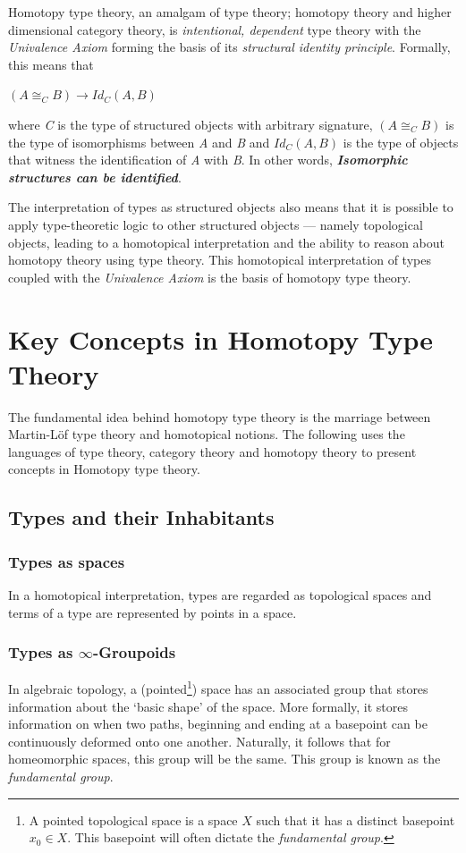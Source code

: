 \documentclass[12pt]{report}
\begin{document}
Homotopy type theory, an amalgam of type theory; homotopy theory and higher dimensional category theory, is \textit{intentional, dependent} type theory with the \textit{Univalence Axiom} forming the basis of its \textit{structural identity principle}. Formally, this means that
\begin{center}
$ (A \cong_C B) \rightarrow Id_C(A,B) $
\end{center}
where \textit{C} is the type of structured objects with arbitrary signature, $ (A \cong_C B)$ is the type of isomorphisms between \textit{A} and \textit{B} and $Id_C(A,B) $ is the type of objects that witness the identification of \textit{A} with \textit{B}. In other words, \textbf{\textit{Isomorphic structures can be identified}}.

The interpretation of types as structured objects also means that it is possible to apply type-theoretic logic to other structured objects --- namely topological objects, leading to a homotopical interpretation and the ability to reason about homotopy theory using type theory. This homotopical interpretation of types coupled with the \textit{Univalence Axiom} is the basis of homotopy type theory.

\pagebreak

\section{Key Concepts in Homotopy Type Theory}
The fundamental idea behind homotopy type theory is the marriage between Martin-L\"of type theory and homotopical notions. The following uses the languages of type theory, category theory and homotopy theory to present concepts in Homotopy type theory. 
\subsection{Types and their Inhabitants}
\subsubsection{Types as spaces}
In a homotopical interpretation, types are regarded as topological spaces and terms of a type are represented by points in a space.
\subsubsection{Types as $\infty$-Groupoids}
In algebraic topology, a (pointed\footnote{

A pointed topological space is a space $X$ such that it has a distinct basepoint $x_0 \in X$. This basepoint will often dictate the \textit{fundamental group}.

}) space has an associated group that stores information about the `basic shape' of the space. More formally, it stores information on when two paths, beginning and ending at a basepoint can be continuously deformed onto one another. Naturally, it follows that for homeomorphic spaces, this group will be the same. This group is known as the \textit{fundamental group}.
\end{document}
